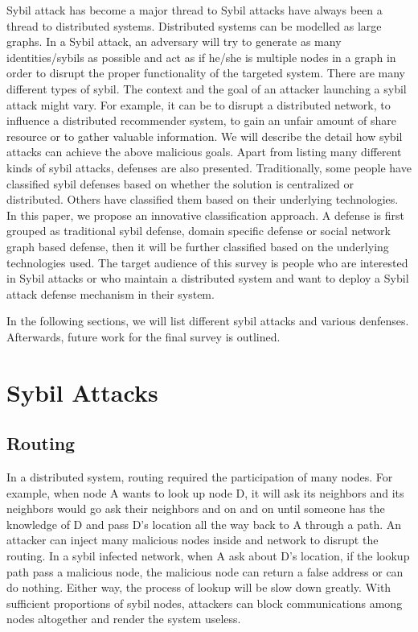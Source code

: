\documentclass[conference]{IEEEtran}
\begin{document}
Sybil attack has become a major thread to 
Sybil attacks have always been a thread to distributed systems.
Distributed systems can be modelled as large graphs.
In a Sybil attack, an adversary will try to generate as many identities/sybils as possible and act as if he/she is multiple nodes in a graph in order to disrupt the proper functionality of the targeted system. 
There are many different types of sybil. 
The context and the goal of an attacker launching a sybil attack might vary. For example, it can be to disrupt a distributed network, to influence a distributed recommender system, to gain an unfair amount of share resource or to gather valuable information.
We will describe the detail how sybil attacks can achieve the above malicious goals. Apart from listing many different kinds of sybil attacks, defenses are also presented.
Traditionally, some people have classified sybil defenses based on whether the solution is centralized or distributed.
Others have classified them based on their underlying technologies. In this paper, we propose an innovative classification approach. 
A defense is first grouped as traditional sybil defense, domain specific defense or social network graph based defense, then it will be further classified based on the underlying technologies used. The target audience of this survey is people who are interested in Sybil attacks or who maintain a distributed system and want to deploy a Sybil attack defense mechanism in their system.

In the following sections, we will list different sybil attacks and various denfenses. Afterwards, future work for the final survey is outlined.

\section{Sybil Attacks}

\subsection{Routing}
In a distributed system, routing required the participation of many nodes. For example, when node A wants to look up node D, it will ask its neighbors and its neighbors would go ask their neighbors and on and on until someone has the knowledge of D and pass D’s location all the way back to A through a path. An attacker can inject many malicious nodes inside and network to disrupt the routing. In a sybil infected network, when A ask about D’s location, if the lookup path pass a malicious node, the malicious node can return a false address or can do nothing. Either way, the process of lookup will be slow down greatly. With sufficient proportions of sybil nodes, attackers can block communications among nodes altogether and render the system useless.
\end{document}
